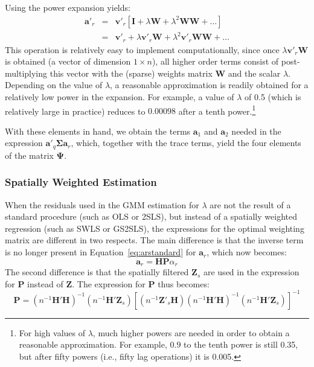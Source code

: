 \documentclass{article}
\begin{document}
Using the power expansion yields:
\begin{eqnarray*}
\mathbf{a'}_r &=& \mathbf{v'}_r [  \mathbf{I} + \lambda \mathbf{W} + \lambda^2 \mathbf{WW} + \dots ]\\
  &=& \mathbf{v'}_r + \lambda \mathbf{v'}_r  \mathbf{W}    +\lambda^2  \mathbf{v'}_r  \mathbf{W }\mathbf{W}   + \dots
\end{eqnarray*}
This operation is relatively easy to implement computationally, since once $\lambda \mathbf{v'}_r  \mathbf{W}$ is obtained (a vector of dimension $1 \times n$), all higher order terms consist of
post-multiplying this vector with the (sparse) weights matrix $\mathbf{W}$ and the scalar $\lambda$.
Depending on the
value of $\lambda$, a reasonable approximation is readily obtained for a
relatively low power in the expansion.
For example, a value of $\lambda$ of 0.5 (which is relatively large in practice) reduces to
$0.00098$ after a tenth power.\footnote{For high values of $\lambda$, much higher powers
are needed in order to obtain a reasonable approximation. For example, $0.9$ to the tenth power is still 0.35, but
after fifty powers (i.e., fifty lag operations) it is 0.005.}

With these elements in hand, we obtain the terms $\mathbf{a}_1$ and $\mathbf{a}_2$ needed
in the expression $\mathbf{a'}_q \mathbf{\Sigma} \mathbf{a}_r$, which, together with the trace
terms, yield the four elements of the matrix $\mathbf{\Psi}$.

\subsubsection{Spatially Weighted Estimation}\label{ss:weightsfilter}
When the residuals used in the GMM estimation for $\lambda$ are not the result of a standard
procedure (such as OLS or 2SLS), but instead of a spatially weighted regression (such as
SWLS or GS2SLS), the expressions for the optimal weighting matrix are different in two
respects. The main difference is that the inverse term is no longer present in
Equation~\ref{eq:arstandard} for $\mathbf{a}_r$, which now becomes:
\begin{equation}\label{eq:arweighted}
\mathbf{a}_r = \mathbf{HP} \alpha_r
\end{equation}
The second difference is that the spatially filtered $\mathbf{Z}_s$ are used in the
expression for $\mathbf{P}$ instead of $\mathbf{Z}$. The expression for $\mathbf{P}$
thus becomes:
\begin{equation}\label{eq:filteredP}
\mathbf{P} = (n^{-1}\mathbf{H'H})^{-1} ( n^{-1} \mathbf{H'Z}_s ) 
        [ (n^{-1} \mathbf{Z'}_s \mathbf{H} ) (n^{-1} \mathbf{H'H} )^{-1} (n^{-1} \mathbf{H'Z}_s) ]^{-1}
\end{equation}
\end{document}
